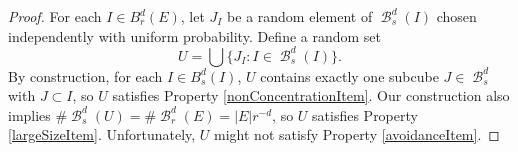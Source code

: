 \documentclass[dvipsnames,letterpaper,12pt]{article}
\numberwithin{equation}{section}
\theoremstyle{plain}
\DeclareMathOperator{\B}{\mathcal{B}}
\begin{document}
\begin{proof}
	For each $I \in B_r^d(E)$, let $J_I$ be a random element of $\B^d_s(I)$ chosen independently with uniform probability. Define a random set
	\begin{equation} \label{Udefinition}
		U = \bigcup \{ J_I : I \in \B^d_s(I) \}.
	\end{equation}
	By construction, for each $I \in B^d_s(I)$, $U$ contains exactly one subcube $J \in \B_s^d$ with $J \subset I$, so $U$ satisfies Property \ref{nonConcentrationItem}. Our construction also implies $\# \B_s^d(U) = \# \B_r^d(E) = |E| r^{-d}$, 
	so $U$ satisfies Property \ref{largeSizeItem}. Unfortunately, $U$ might not satisfy Property \ref{avoidanceItem}. %


\end{proof}
\end{document}
